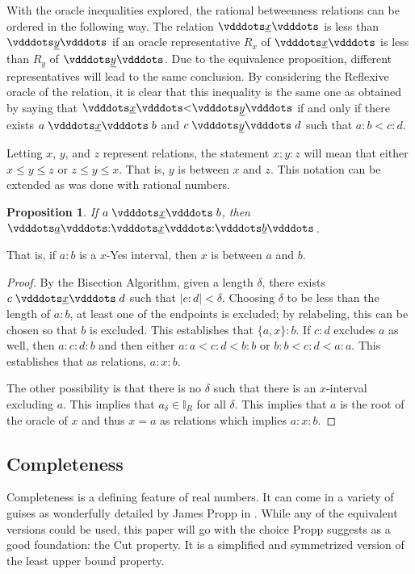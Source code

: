 \documentclass[12pt]{article}
\newtheorem{proposition}{Proposition}[section]
\begin{document}
With the oracle inequalities explored, the rational betweenness relations can be ordered in the following way. The relation $\xrel$ is less than $\xrel[y]$ if an oracle representative $R_x$ of $\xrel$ is less than $R_y$ of $\xrel[y]$. Due to the equivalence proposition, different representatives will lead to the same conclusion. By considering the Reflexive oracle of the relation, it is clear that this inequality is the same one as obtained by saying that $\xrel < \xrel[y]$ if and only if there exists $a \xrel b$ and $c \xrel[y] d$ such that $a:b < c:d$. 

Letting $x$, $y$, and $z$ represent relations, the statement $x:y:z$ will mean that either $x \leq y \leq z$ or $z \leq y \leq x$. That is, $y$ is between $x$ and $z$. This notation can be extended as was done with rational numbers. 

\begin{proposition}
    If $a \xrel b$, then $\xrel[a] : \xrel : \xrel[b]$.
\end{proposition}

That is, if $a:b$ is a $x$-Yes interval, then $x$ is between $a$ and $b$.

\begin{proof}
    By the Bisection Algorithm, given a length $\delta$, there exists $c \xrel d$ such that $|c:d|<\delta$. Choosing $\delta$ to be less than the length of $a:b$, at least one of the endpoints is excluded; by relabeling, this can be chosen so that $b$ is excluded. This establishes that $\{a, x\} : b$. If $c:d$ excludes $a$ as well, then $a : c:d:b$ and then either $a:a < c:d < b:b$ or $b:b < c:d < a:a$. This establishes that as relations, $a : x : b$. 

    The other possibility is that there is no $\delta$ such that there is an $x$-interval excluding $a$. This implies that $a_\delta \in \mathbb{I}_R$ for all $\delta$. This implies that $a$ is the root of the oracle of $x$ and thus $x = a$ as relations which implies $a:x:b$. 
\end{proof}


\subsection{Completeness}

Completeness is a defining feature of real numbers. It can come in a variety of guises as wonderfully detailed by James Propp in \cite{propp}. While any of the equivalent versions could be used, this paper will go with the choice Propp suggests as a good foundation: the Cut property. It is a simplified and symmetrized version of the least upper bound property. 
\end{document}
